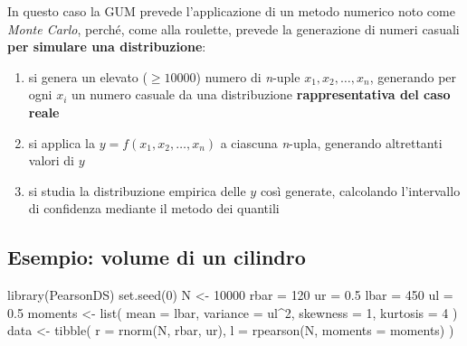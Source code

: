\documentclass[
  letterpaper,
  DIV=11,
  numbers=noendperiod,
  oneside]{scrartcl}
\newenvironment{Shaded}{\begin{snugshade}}{\end{snugshade}}
\newcommand{\AttributeTok}[1]{\textcolor[rgb]{0.40,0.45,0.13}{#1}}
\newcommand{\DecValTok}[1]{\textcolor[rgb]{0.68,0.00,0.00}{#1}}
\newcommand{\FloatTok}[1]{\textcolor[rgb]{0.68,0.00,0.00}{#1}}
\newcommand{\FunctionTok}[1]{\textcolor[rgb]{0.28,0.35,0.67}{#1}}
\newcommand{\NormalTok}[1]{\textcolor[rgb]{0.00,0.23,0.31}{#1}}
\newcommand{\OtherTok}[1]{\textcolor[rgb]{0.00,0.23,0.31}{#1}}
\newcommand{\SpecialCharTok}[1]{\textcolor[rgb]{0.37,0.37,0.37}{#1}}
\providecommand{\tightlist}{%
  \setlength{\itemsep}{0pt}\setlength{\parskip}{0pt}}
\begin{document}
In questo caso la GUM prevede l'applicazione di un metodo numerico noto
come \emph{Monte Carlo}, perché, come alla roulette, prevede la
generazione di numeri casuali \textbf{per simulare una distribuzione}:

\begin{enumerate}
\def\labelenumi{\arabic{enumi}.}
\tightlist
\item
  si genera un elevato (\(\geq10000\)) numero di \emph{n}-uple
  \(x_1,x_2,\dots, x_n\), generando per ogni \(x_i\) un numero casuale
  da una distribuzione \textbf{rappresentativa del caso reale}
\item
  si applica la \(y=f(x_1,x_2,\dots, x_n)\) a ciascuna \emph{n}-upla,
  generando altrettanti valori di \(y\)
\item
  si studia la distribuzione empirica delle \(y\) così generate,
  calcolando l'intervallo di confidenza mediante il metodo dei quantili
\end{enumerate}


\subsection{Esempio: volume di un
cilindro}\label{esempio-volume-di-un-cilindro-1}

\begin{Shaded}
\begin{Highlighting}[]
\FunctionTok{library}\NormalTok{(PearsonDS)}
\FunctionTok{set.seed}\NormalTok{(}\DecValTok{0}\NormalTok{)}
\NormalTok{N }\OtherTok{\textless{}{-}} \DecValTok{10000}
\NormalTok{rbar }\OtherTok{=} \DecValTok{120}
\NormalTok{ur }\OtherTok{=} \FloatTok{0.5}
\NormalTok{lbar }\OtherTok{=} \DecValTok{450}
\NormalTok{ul }\OtherTok{=} \FloatTok{0.5}
\NormalTok{moments }\OtherTok{\textless{}{-}} \FunctionTok{list}\NormalTok{(}
  \AttributeTok{mean =}\NormalTok{ lbar, }
  \AttributeTok{variance =}\NormalTok{ ul}\SpecialCharTok{\^{}}\DecValTok{2}\NormalTok{, }
  \AttributeTok{skewness =} \DecValTok{1}\NormalTok{, }
  \AttributeTok{kurtosis =} \DecValTok{4}
\NormalTok{)}
\NormalTok{data }\OtherTok{\textless{}{-}} \FunctionTok{tibble}\NormalTok{(}
  \AttributeTok{r =} \FunctionTok{rnorm}\NormalTok{(N, rbar, ur),}
  \AttributeTok{l =} \FunctionTok{rpearson}\NormalTok{(N, }\AttributeTok{moments =}\NormalTok{ moments)}
\NormalTok{)}
\end{Highlighting}
\end{Shaded}
\end{document}
